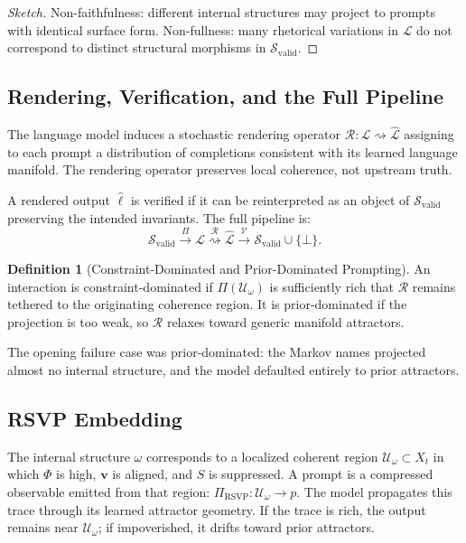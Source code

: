 \documentclass[12pt, a4paper]{article}
\newcommand{\xrightsquigarrow}[1]{%
  \mathrel{\overset{#1}{\rightsquigarrow}}%
}
\theoremstyle{plain}
\theoremstyle{definition}
\newtheorem{definition}[theorem]{Definition}
\theoremstyle{remark}
\begin{document}
\begin{proof}[Sketch]
Non-faithfulness: different internal structures may project to prompts with identical surface form. Non-fullness: many rhetorical variations in $\mathcal{L}$ do not correspond to distinct structural morphisms in $\mathcal{S}_{\mathrm{valid}}$.
\end{proof}

\subsection{Rendering, Verification, and the Full Pipeline}

The language model induces a stochastic rendering operator $\mathcal{R} : \mathcal{L} \rightsquigarrow \widehat{\mathcal{L}}$ assigning to each prompt a distribution of completions consistent with its learned language manifold. The rendering operator preserves local coherence, not upstream truth.

A rendered output $\hat{\ell}$ is verified if it can be reinterpreted as an object of $\mathcal{S}_{\mathrm{valid}}$ preserving the intended invariants. The full pipeline is:
\[
\mathcal{S}_{\mathrm{valid}}
\xrightarrow{\Pi}
\mathcal{L}
\xrightsquigarrow{\mathcal{R}}
\widehat{\mathcal{L}}
\xrightarrow{\mathcal{V}}
\mathcal{S}_{\mathrm{valid}} \cup \{\bot\}.
\]

\begin{definition}[Constraint-Dominated and Prior-Dominated Prompting]
An interaction is constraint-dominated if $\Pi(\mathcal{U}_\omega)$ is sufficiently rich that $\mathcal{R}$ remains tethered to the originating coherence region. It is prior-dominated if the projection is too weak, so $\mathcal{R}$ relaxes toward generic manifold attractors.
\end{definition}

The opening failure case was prior-dominated: the Markov names projected almost no internal structure, and the model defaulted entirely to prior attractors.

\subsection{RSVP Embedding}

The internal structure $\omega$ corresponds to a localized coherent region $\mathcal{U}_\omega \subset X_t$ in which $\Phi$ is high, $\mathbf{v}$ is aligned, and $S$ is suppressed. A prompt is a compressed observable emitted from that region: $\Pi_{\mathrm{RSVP}} : \mathcal{U}_\omega \to p$. The model propagates this trace through its learned attractor geometry. If the trace is rich, the output remains near $\mathcal{U}_\omega$; if impoverished, it drifts toward prior attractors.
\end{document}
